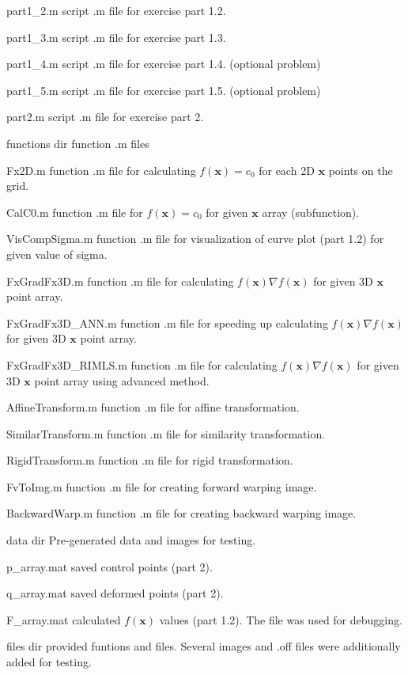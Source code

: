 \documentclass[paper=a4, fontsize=11pt]{scrartcl} %
\numberwithin{equation}{section} %
\numberwithin{figure}{section} %
\numberwithin{table}{section} %
\renewcommand{\vec}[1]{\mathbf{#1}}
\begin{document}
\begin{filedescription}
	\item [part1\_2.m] script .m file for exercise part 1.2.
	\item [part1\_3.m] script .m file for exercise part 1.3.
	\item [part1\_4.m] script .m file for exercise part 1.4. (optional problem)
	\item [part1\_5.m] script .m file for exercise part 1.5. (optional problem)
	\item [part2.m] script .m file for exercise part 2.
	\item [functions dir] function .m files 
		\begin{filedescription}
			\item [Fx2D.m] function .m file for calculating $f(\vec{x}) = c_0$ for each 2D $\vec{x}$ points on the grid.
			\item [CalC0.m] function .m file for $f(\vec{x}) = c_0$ for given $\vec{x}$ array (subfunction).
			\item [VisCompSigma.m] function .m file for visualization of curve plot (part 1.2) for given value of sigma.
			\item [FxGradFx3D.m] function .m file for calculating $f(\vec{x}) \nabla f(\vec{x})$ for given 3D $\vec{x}$ point array.
			\item [FxGradFx3D\_ANN.m] function .m file for speeding up calculating $f(\vec{x}) \nabla f(\vec{x})$ for given 3D $\vec{x}$ point array.
			\item [FxGradFx3D\_RIMLS.m] function .m file for calculating $f(\vec{x}) \nabla f(\vec{x})$ for given 3D $\vec{x}$ point array using advanced method.
			\item [AffineTransform.m] function .m file for affine transformation.
			\item [SimilarTransform.m] function .m file for similarity transformation.    
			\item [RigidTransform.m] function .m file for rigid transformation. 
			\item [FvToImg.m] function .m file for creating forward warping image.
			\item [BackwardWarp.m] function .m file for creating backward warping image.
		\end{filedescription}
	\item [data dir] Pre-generated data and images for testing.
		\begin{filedescription}
			\item [p\_array.mat] saved control points (part 2).  
			\item [q\_array.mat] saved deformed points (part 2).
			\item [F\_array.mat] calculated $f(\vec{x})$ values (part 1.2). The file was used for debugging.
		\end{filedescription}
	\item [files dir] provided funtions and files. Several images and .off files were additionally added for testing.   
\end{filedescription}
\end{document}
